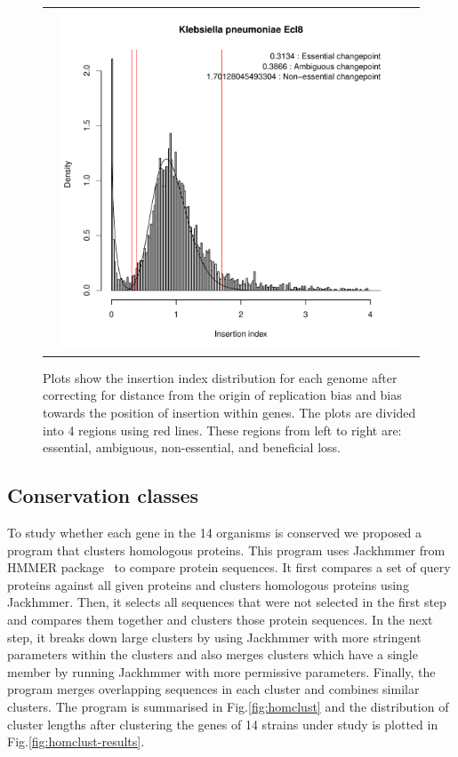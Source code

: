 \documentclass[12pt,letterpaper]{article}
\begin{document}
\begin{figure}
\begin{tabular}{c c c}
&\includegraphics[page=13, scale=0.25]{essentiality-normalised.pdf}&\\
\end{tabular}
\caption{Plots show the insertion index distribution for each genome after correcting for distance from the origin of replication bias and bias towards the position of insertion within genes. The plots are divided into 4 regions using red lines. These regions from left to right are: essential, ambiguous, non-essential, and beneficial loss.}
\label{fig:iidist-species-normalised}
\end{figure}

\subsection{Conservation classes}\label{sec:conservationclasses}
To study whether each gene in the 14 organisms is conserved we proposed a program that clusters homologous proteins. This program uses Jackhmmer from HMMER package~\cite{eddy_accelerated_2011} to compare protein sequences. It first compares a set of query proteins against all given proteins and clusters homologous proteins using Jackhmmer. Then, it selects all sequences that were not selected in the first step and compares them together and clusters those protein sequences. In the next step, it breaks down large clusters by using Jackhmmer with more stringent parameters within the clusters and also merges clusters which have a single member by running Jackhmmer with more permissive parameters. Finally, the program merges overlapping sequences in each cluster and combines similar clusters. The program is summarised in Fig.\@ \ref{fig:homclust} and the distribution of cluster lengths after clustering the genes of 14 strains under study is plotted in Fig.\@ \ref{fig:homclust-results}.
\end{document}
